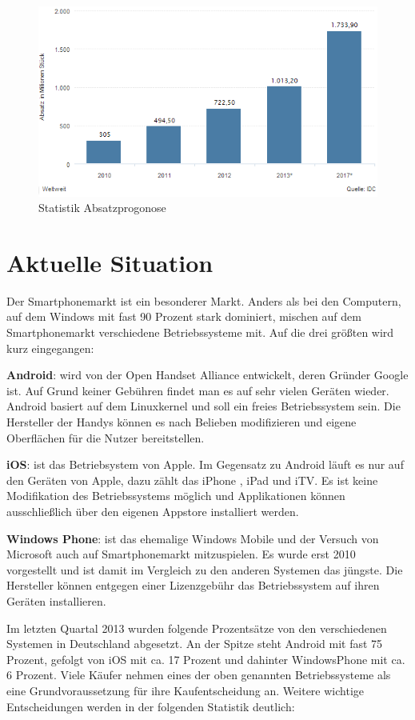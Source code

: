 \begin{figure}[H]
\centering
\includegraphics[width=0.7\linewidth]{../images/statista1.png}
\caption{Statistik Absatzprogonose}
\label{fig:statista1}
\end{figure}

\section{Aktuelle Situation}

Der Smartphonemarkt ist ein besonderer Markt. Anders als bei den Computern, auf dem Windows mit fast 90 Prozent 
 stark dominiert, mischen auf dem Smartphonemarkt verschiedene Betriebssysteme mit. Auf die drei größten wird kurz eingegangen:

\textbf{Android}: wird von  der Open Handset Alliance entwickelt, deren Gründer Google ist. Auf Grund keiner Gebühren findet man es  auf sehr vielen Geräten wieder. Android basiert auf dem Linuxkernel und soll ein freies Betriebssystem sein. Die Hersteller der Handys können es nach Belieben modifizieren und eigene Oberflächen für die Nutzer bereitstellen.

\textbf{iOS}: ist das Betriebsystem von Apple. Im Gegensatz zu Android läuft es nur auf den Geräten von Apple, dazu zählt das iPhone , iPad und iTV. Es ist keine Modifikation des Betriebssystems möglich und Applikationen können ausschließlich über den eigenen Appstore installiert werden.
 
\textbf{Windows Phone}: ist das ehemalige Windows Mobile und der Versuch von Microsoft auch auf Smartphonemarkt mitzuspielen. Es wurde erst 2010 vorgestellt und ist damit im Vergleich zu den anderen Systemen das jüngste. Die Hersteller können entgegen einer Lizenzgebühr das Betriebssystem auf ihren Geräten installieren.


Im letzten Quartal 2013 wurden folgende Prozentsätze von den verschiedenen Systemen in Deutschland abgesetzt. An der Spitze steht Android mit fast 75 Prozent, gefolgt von iOS mit ca. 17 Prozent und dahinter WindowsPhone mit ca. 6 Prozent.
Viele Käufer nehmen eines der oben genannten Betriebssysteme als  eine Grundvoraussetzung für ihre Kaufentscheidung an. Weitere wichtige Entscheidungen werden in der folgenden Statistik deutlich:

